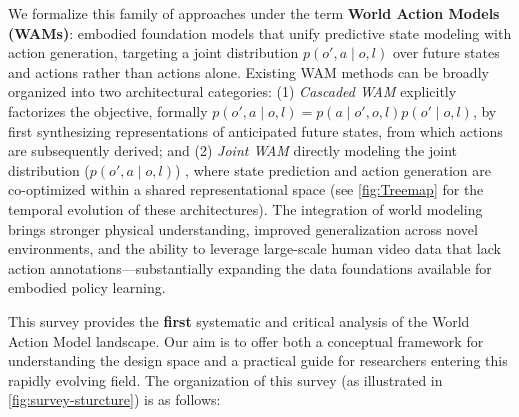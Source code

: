 We formalize this family of approaches under the term \textbf{World Action Models (WAMs)}: embodied foundation models that unify predictive state modeling with action generation, targeting a joint distribution $p(o', a \mid o, l)$ over future states and actions rather than actions alone. Existing WAM methods can be broadly organized into two architectural categories: (1) \textit{Cascaded WAM} explicitly factorizes the objective, formally $p(o', a \mid o, l) = p(a \mid o', o, l)p(o' \mid o, l)$, by first synthesizing representations of anticipated future states, from which actions are subsequently derived; and (2) \textit{Joint WAM} directly modeling the joint distribution ($p(o', a \mid o, l)$)
, where state prediction and action generation are co-optimized within a shared representational space (see \autoref{fig:Treemap} for the temporal evolution of these architectures). The integration of world modeling brings stronger physical understanding, improved generalization across novel environments, and the ability to leverage large-scale human video data that lack action annotations—substantially expanding the data foundations available for embodied policy learning.

This survey provides the \textbf{first} systematic and critical analysis of the World Action Model landscape. Our aim is to offer both a conceptual framework for understanding the design space and a practical guide for researchers entering this rapidly evolving field. The organization of this survey (as illustrated in \autoref{fig:survey-sturcture}) is as follows:



